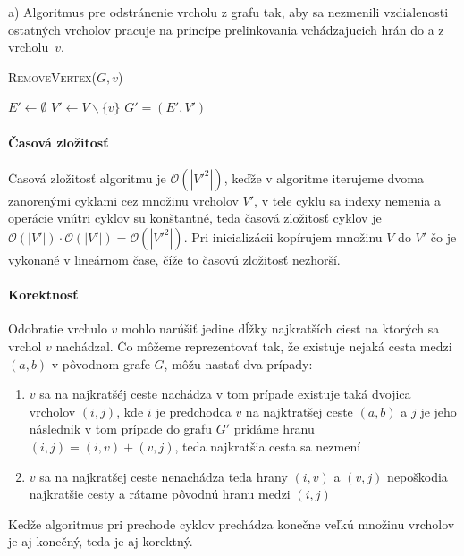 \documentclass[12pt]{iv003}
\begin{document}
a) Algoritmus pre odstránenie vrcholu z grafu tak, aby sa nezmenili vzdialenosti ostatných vrcholov pracuje na princípe prelinkovania vchádzajucich hrán do a z vrcholu~$v$.

\begin{algorithm}[H]
	\caption{\textsc{RemoveVertex}($G, v$)}
	$E' \leftarrow \emptyset$\;
	$V' \leftarrow V \backslash \{v\}$\;
	\Return $G' = (E',V')$
\end{algorithm}

\paragraph{Časová zložitosť}
Časová zložitosť algoritmu je $\mathcal{O}(|V'^{2}|)$, keďže v algoritme iterujeme dvoma zanorenými cyklami cez množinu vrcholov $V'$, v tele cyklu sa indexy nemenia a operácie vnútri cyklov su konštantné, teda časová zložitosť cyklov je $\mathcal{O}(|V'|) \cdot \mathcal{O}(|V'|) = \mathcal{O}(|V'^{2}|)$. Pri inicializácii kopírujem množinu $V$ do $V'$ čo je vykonané v lineárnom čase, číže to časovú zložitosť nezhorší.

\paragraph{Korektnosť}
Odobratie vrchulo $v$ mohlo narúšiť jedine dĺžky najkratších ciest na ktorých sa vrchol $v$ nachádzal. Čo môžeme reprezentovať tak, že existuje nejaká cesta medzi $(a,b)$ v pôvodnom grafe $G$, môžu nastať dva prípady:
\begin{enumerate}
	\item $v$ sa na najkratšéj ceste nachádza v tom prípade existuje taká dvojica vrcholov $(i,j)$, kde $i$ je predchodca $v$ na najktratšej ceste $(a,b)$ a $j$ je jeho následnik v tom prípade do grafu $G'$ pridáme hranu $(i,j) = (i,v) + (v,j)$, teda najkratšia cesta sa nezmení
	\item $v$ sa na najkratšej ceste nenachádza teda hrany $(i,v)$ a $(v,j)$ nepoškodia najkratšie cesty a rátame pôvodnú hranu medzi $(i,j)$
\end{enumerate}
Keďže algoritmus pri prechode cyklov prechádza konečne veľkú množinu vrcholov je aj konečný, teda je aj korektný.\\
\end{document}
